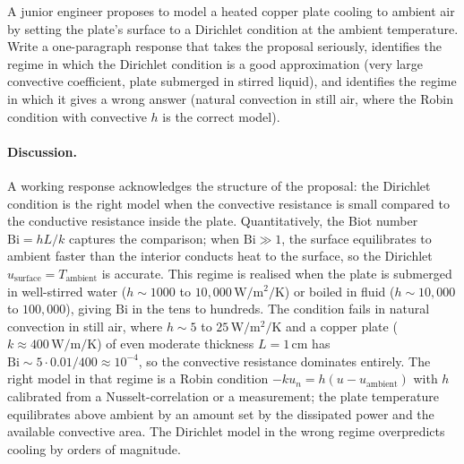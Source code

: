 \begin{exercise}
A junior engineer proposes to model a heated copper plate cooling
to ambient air by setting the plate's surface to a Dirichlet
condition at the ambient temperature. Write a one-paragraph
response that takes the proposal seriously, identifies the regime
in which the Dirichlet condition is a good approximation (very
large convective coefficient, plate submerged in stirred liquid),
and identifies the regime in which it gives a wrong answer
(natural convection in still air, where the Robin condition with
convective $h$ is the correct model).

\paragraph{Discussion.}
A working response acknowledges the structure of the proposal:
the Dirichlet condition is the right model when the convective
resistance is small compared to the conductive resistance inside
the plate. Quantitatively, the Biot number $\text{Bi} = h L/k$
captures the comparison; when $\text{Bi} \gg 1$, the surface
equilibrates to ambient faster than the interior conducts heat to
the surface, so the Dirichlet $u_{\text{surface}} =
T_{\text{ambient}}$ is accurate. This regime is realised when the
plate is submerged in well-stirred water ($h \sim 1000$ to $10{,}
000\,\si{\watt\per\meter\squared\per\kelvin}$) or boiled in fluid
($h \sim 10{,}000$ to $100{,}000$), giving $\text{Bi}$ in the
tens to hundreds. The condition fails in natural convection in
still air, where $h \sim 5$ to $25\,\si{\watt\per\meter\squared
\per\kelvin}$ and a copper plate ($k \approx 400\,\si{\watt\per
\meter\per\kelvin}$) of even moderate thickness $L = 1\,\si{\centi
\meter}$ has $\text{Bi} \sim 5 \cdot 0.01/400 \approx 10^{-4}$, so
the convective resistance dominates entirely. The right model in
that regime is a Robin condition $-k u_{n} = h(u - u_{\text{ambient}})$
with $h$ calibrated from a Nusselt-correlation or a measurement;
the plate temperature equilibrates above ambient by an amount set
by the dissipated power and the available convective area. The
Dirichlet model in the wrong regime overpredicts cooling by orders
of magnitude.
\end{exercise}

